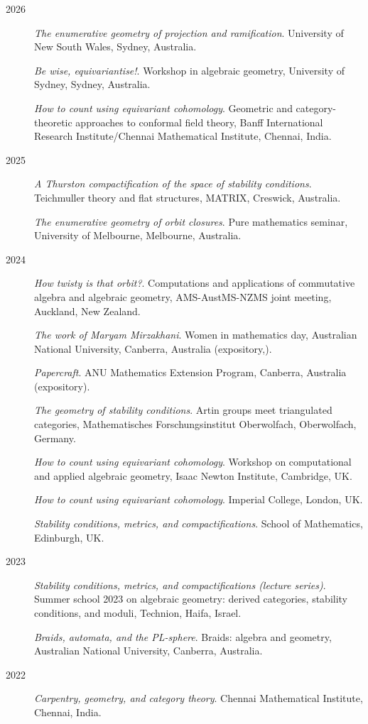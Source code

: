 \documentclass[11pt]{article}
\begin{document}
\label{orgd35e6b3}
\begin{description}
\item[{2026}] \emph{The enumerative geometry of projection and ramification}.
University of New South Wales, Sydney, Australia.

\emph{Be wise, equivariantise!}.
Workshop in algebraic geometry, University of Sydney, Sydney, Australia.

\emph{How to count using equivariant cohomology}.
Geometric and category-theoretic approaches to conformal field theory, Banff International Research Institute/Chennai Mathematical Institute, Chennai, India.
\item[{2025}] \emph{A Thurston compactification of the space of stability conditions}.
Teichmuller theory and flat structures, MATRIX, Creswick, Australia.

\emph{The enumerative geometry of orbit closures}.
Pure mathematics seminar, University of Melbourne, Melbourne, Australia.
\item[{2024}] \emph{How twisty is that orbit?}.
Computations and applications of commutative algebra and algebraic geometry, AMS-AustMS-NZMS joint meeting, Auckland, New Zealand.

\emph{The work of Maryam Mirzakhani}.
Women in mathematics day, Australian National University, Canberra, Australia (expository,).

\emph{Papercraft}.
ANU Mathematics Extension Program, Canberra, Australia (expository).

\emph{The geometry of stability conditions}.
Artin groups meet triangulated categories, Mathematisches Forschungsinstitut Oberwolfach, Oberwolfach, Germany.

\emph{How to count using equivariant cohomology}.
Workshop on computational and applied algebraic geometry, Isaac Newton Institute, Cambridge, UK.

\emph{How to count using equivariant cohomology}.
Imperial College, London, UK.

\emph{Stability conditions, metrics, and compactifications}.
School of Mathematics, Edinburgh, UK.
\item[{2023}] \emph{Stability conditions, metrics, and compactifications (lecture series)}.
Summer school 2023 on algebraic geometry: derived categories, stability conditions, and moduli, Technion, Haifa, Israel.

\emph{Braids, automata, and the PL-sphere}.
Braids: algebra and geometry, Australian National University, Canberra, Australia.
\item[{2022}] \emph{Carpentry, geometry, and category theory}.
Chennai Mathematical Institute, Chennai, India.


\end{description}
\end{document}
